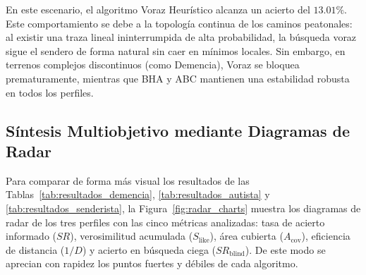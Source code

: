 \begin{table}[H]
	{\label{tab:resultados_senderista}
	}
\end{table}

En este escenario, el algoritmo Voraz Heurístico alcanza un acierto del $13.01\%$. Este comportamiento se debe a la topología continua de los caminos peatonales: al existir una traza lineal ininterrumpida de alta probabilidad, la búsqueda voraz sigue el sendero de forma natural sin caer en mínimos locales. Sin embargo, en terrenos complejos discontinuos (como Demencia), Voraz se bloquea prematuramente, mientras que BHA y ABC mantienen una estabilidad robusta en todos los perfiles.

\subsection{Síntesis Multiobjetivo mediante Diagramas de Radar}

Para comparar de forma más visual los resultados de las Tablas~\ref{tab:resultados_demencia}, \ref{tab:resultados_autista} y \ref{tab:resultados_senderista}, la Figura~\ref{fig:radar_charts} muestra los diagramas de radar de los tres perfiles con las cinco métricas analizadas: tasa de acierto informado ($SR$), verosimilitud acumulada ($S_{\text{like}}$), área cubierta ($A_{\text{cov}}$), eficiencia de distancia ($1/D$) y acierto en búsqueda ciega ($SR_{\text{blind}}$). De este modo se aprecian con rapidez los puntos fuertes y débiles de cada algoritmo.

